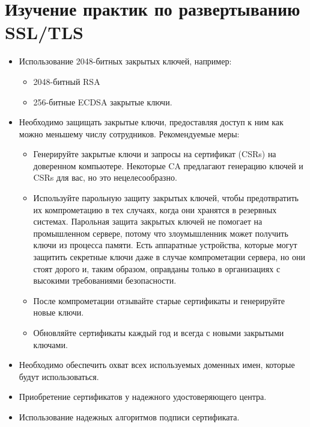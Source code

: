 \documentclass[10pt,a4paper]{report}
\begin{document}
	\section{Изучение практик по развертыванию SSL/TLS}
		\begin{itemize}
			\item Использование 2048-битных закрытых ключей, например:
			\begin{itemize}
				\item 2048-битный RSA 
				\item 256-битные ECDSA закрытые ключи.
			\end{itemize}
			
		\item Необходимо защищать закрытые ключи, предоставляя доступ к ним как можно меньшему числу сотрудников. Рекомендуемые меры:
		\begin{itemize}
				\item Генерируйте закрытые ключи и запросы на сертификат (CSRs) на доверенном компьютере. Некоторые CA предлагают генерацию ключей и CSRs для вас, но это нецелесообразно.

				\item Используйте парольную защиту закрытых ключей, чтобы предотвратить их компрометацию в тех случаях, когда они хранятся в резервных системах. Парольная защита закрытых ключей не помогает на промышленном сервере, потому что злоумышленник может получить ключи из процесса памяти. Есть аппаратные устройства, которые могут защитить секретные ключи даже в случае компрометации сервера, но они стоят дорого и, таким образом, оправданы только в организациях с высокими требованиями безопасности.

				\item После компрометации отзывайте старые сертификаты и генерируйте новые ключи.

				\item Обновляйте сертификаты каждый год и всегда с новыми закрытыми ключами.
			\end{itemize}		
			
			\item Необходимо обеспечить охват всех используемых доменных имен, 
			которые будут использоваться.
			
			\item Приобретение сертификатов у надежного удостоверяющего центра.
			
			\item Использование надежных алгоритмов подписи сертификата.
			

\end{itemize}
\end{document}
